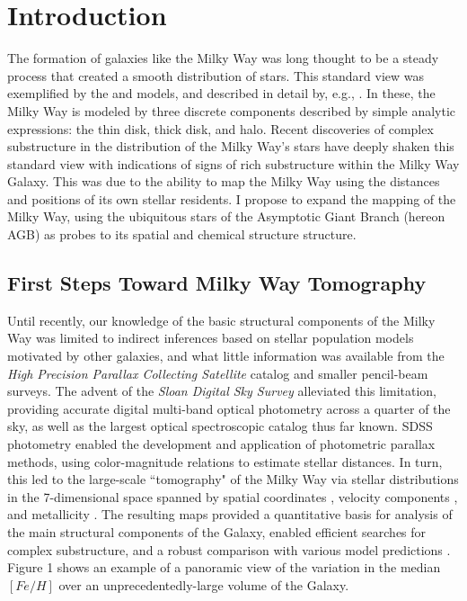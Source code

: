 \section{Introduction}
The formation of galaxies like the Milky Way was long thought to be a steady process that created a smooth distribution of stars. This standard view was exemplified by the \cite{1980ApJS...44...73B} and \cite{1989ARA&A..27..555G} models, and described in detail by, e.g., \cite{1993ARA&A..31..575M}. In these, the Milky Way is modeled by three discrete components described by simple analytic expressions: the thin disk, thick disk, and halo. Recent discoveries of complex substructure in the distribution of the Milky Way's stars \citep[e.g.][]{2000AJ....120..963I,2000ApJ...540..825Y,2001ApJ...554L..33V,2002ApJ...569..245N,2003ApJ...599.1082M,2006ApJ...642L.137B,2006ApJ...651L..29G,2006AJ....132..714V,2008ApJ...673..864J} have deeply shaken this standard view with indications of signs of rich substructure within the Milky Way Galaxy. This was due to the ability to map the Milky Way using the distances and positions of its own stellar residents. I propose to expand the mapping of the Milky Way, using the ubiquitous stars of the Asymptotic Giant Branch (hereon AGB) as probes to its spatial and chemical structure structure.

\subsection{First Steps Toward Milky Way Tomography}
Until recently, our knowledge of the basic structural components of the Milky Way was limited to indirect inferences based on stellar population models motivated by other galaxies, and what little information was available from the \emph{High Precision Parallax Collecting Satellite} \cite[HIPPARCOS;][]{1984SSRv...39....1K} catalog and smaller pencil-beam surveys.  The advent of the \emph{Sloan Digital Sky Survey} \citep[SDSS;][]{2000AJ....120.1579Y} alleviated this limitation, providing accurate digital multi-band optical photometry across a quarter of the sky, as well as the largest optical spectroscopic catalog thus far known. SDSS photometry enabled the development and application of photometric parallax methods, using color-magnitude relations to estimate stellar distances. In turn, this led to the large-scale ``tomography" of the Milky Way via stellar distributions in the 7-dimensional space spanned by spatial coordinates \citep{2008ApJ...673..864J}, velocity components \citep{2010ApJ...716....1B}, and metallicity \citep{2008ApJ...684..287I}. The resulting maps provided a quantitative basis for analysis of the main structural components of the Galaxy, enabled efficient searches for complex substructure, and a robust comparison with various model predictions \citep{2012ApJ...757..166B,2012ARA&A..50..251I}.  Figure 1 shows an example of a panoramic view of the variation in the median $[Fe/H]$ over an unprecedentedly-large volume of the Galaxy. %


